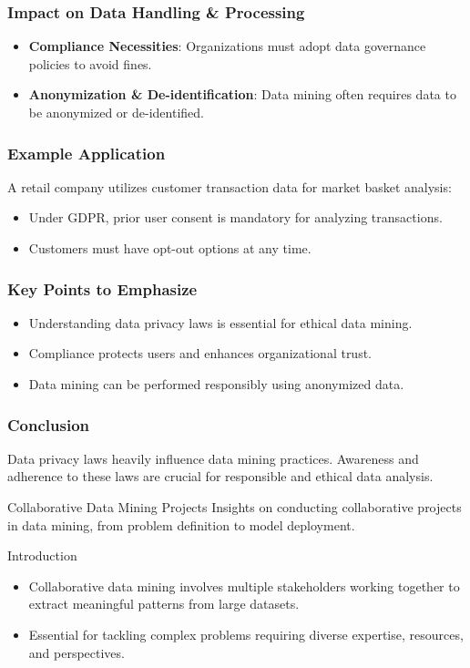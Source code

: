 \documentclass[aspectratio=169]{beamer}
\begin{document}
\begin{frame}[fragile]
    \frametitle{Impact on Data Handling \& Processing}
    \begin{itemize}
        \item \textbf{Compliance Necessities}: Organizations must adopt data governance policies to avoid fines.
        \item \textbf{Anonymization \& De-identification}: Data mining often requires data to be anonymized or de-identified.
    \end{itemize}
\end{frame}

\begin{frame}[fragile]
    \frametitle{Example Application}
    A retail company utilizes customer transaction data for market basket analysis:
    \begin{itemize}
        \item Under GDPR, prior user consent is mandatory for analyzing transactions.
        \item Customers must have opt-out options at any time.
    \end{itemize}
\end{frame}

\begin{frame}[fragile]
    \frametitle{Key Points to Emphasize}
    \begin{itemize}
        \item Understanding data privacy laws is essential for ethical data mining.
        \item Compliance protects users and enhances organizational trust.
        \item Data mining can be performed responsibly using anonymized data.
    \end{itemize}
\end{frame}

\begin{frame}[fragile]
    \frametitle{Conclusion}
    Data privacy laws heavily influence data mining practices. Awareness and adherence to these laws are crucial for responsible and ethical data analysis.
\end{frame}

\begin{frame}{Collaborative Data Mining Projects}
    Insights on conducting collaborative projects in data mining, from problem definition to model deployment.
\end{frame}

\begin{frame}{Introduction}
    \begin{itemize}
        \item Collaborative data mining involves multiple stakeholders working together to extract meaningful patterns from large datasets.
        \item Essential for tackling complex problems requiring diverse expertise, resources, and perspectives.
    \end{itemize}
\end{frame}
\end{document}
